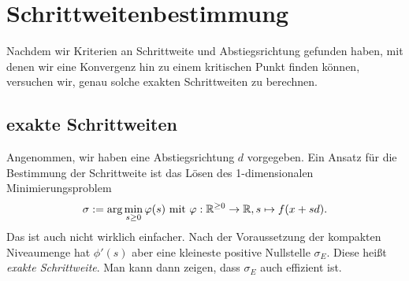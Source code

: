 \section{Schrittweitenbestimmung}
Nachdem wir Kriterien an Schrittweite und Abstiegsrichtung gefunden haben, mit denen wir eine Konvergenz hin zu einem kritischen Punkt finden können, versuchen wir, genau solche exakten Schrittweiten zu berechnen.
\subsection{exakte Schrittweiten}
Angenommen, wir haben eine Abstiegsrichtung $d$ vorgegeben. Ein Ansatz für die Bestimmung der Schrittweite ist das Lösen des 1-dimensionalen Minimierungsproblem
\begin{equation}
\sigma := \text{arg}\min_{s\geq 0} \varphi(s)\text{ mit } \varphi:\mathbb{R}^{\geq 0}\to \mathbb{R}, s\mapsto f(x+sd).
\end{equation}
Das ist auch nicht wirklich einfacher. Nach der Voraussetzung der kompakten Niveaumenge hat $\phi'(s)$ aber eine kleineste positive Nullstelle $\sigma_E$. Diese heißt \emph{exakte Schrittweite}. Man kann dann zeigen, dass $\sigma_E$ auch effizient ist.
\lec